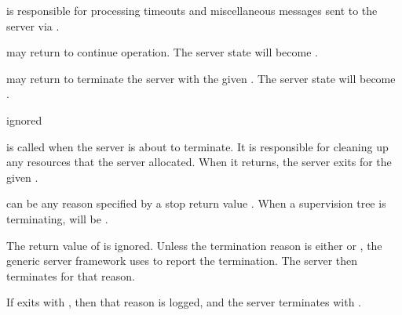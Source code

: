  is responsible for processing timeouts and
miscellaneous messages sent to the server via .

 may return  to continue operation. The server state will
become .

 may return  to terminate the server with the given
. The server state will become .

\begin{procedure}
\end{procedure}
\returns{} ignored

\begin{argtbl}
\end{argtbl}

 is called when the server is about to terminate. It
is responsible for cleaning up any resources that the server
allocated. When it returns, the server exits for the given
.

 can be any reason specified by a stop return value
. When a supervision tree is terminating,
 will be .

The return value of  is ignored.  Unless the
termination reason is either  or , the
generic server framework uses  to report the
termination. The server then terminates for that reason.

If  exits with , then that reason is
logged, and the server terminates with .
